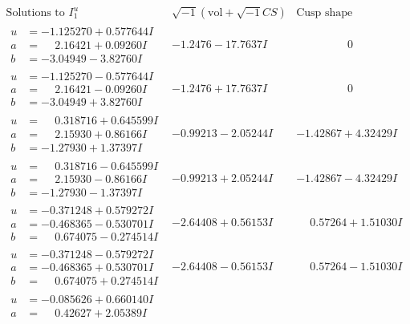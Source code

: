 \documentclass[1p]{elsarticle_modified}
\theoremstyle{definition}
\newcommand{\I}{\sqrt{-1}}
\begin{document}
$$\begin{array}{c|c|c}
\text{Solutions to }I^u_{1}& \I (\text{vol} + \sqrt{-1}CS) & \text{Cusp shape}\\
 \hline 
\begin{aligned}
u &= -1.125270 + 0.577644 I \\
a &= \phantom{-}2.16421 + 0.09260 I \\
b &= -3.04949 - 3.82760 I\end{aligned}
 & -1.2476 - 17.7637 I & \phantom{-0.000000 } 0 \\ \hline\begin{aligned}
u &= -1.125270 - 0.577644 I \\
a &= \phantom{-}2.16421 - 0.09260 I \\
b &= -3.04949 + 3.82760 I\end{aligned}
 & -1.2476 + 17.7637 I & \phantom{-0.000000 } 0 \\ \hline\begin{aligned}
u &= \phantom{-}0.318716 + 0.645599 I \\
a &= \phantom{-}2.15930 + 0.86166 I \\
b &= -1.27930 + 1.37397 I\end{aligned}
 & -0.99213 - 2.05244 I & -1.42867 + 4.32429 I \\ \hline\begin{aligned}
u &= \phantom{-}0.318716 - 0.645599 I \\
a &= \phantom{-}2.15930 - 0.86166 I \\
b &= -1.27930 - 1.37397 I\end{aligned}
 & -0.99213 + 2.05244 I & -1.42867 - 4.32429 I \\ \hline\begin{aligned}
u &= -0.371248 + 0.579272 I \\
a &= -0.468365 - 0.530701 I \\
b &= \phantom{-}0.674075 - 0.274514 I\end{aligned}
 & -2.64408 + 0.56153 I & \phantom{-}0.57264 + 1.51030 I \\ \hline\begin{aligned}
u &= -0.371248 - 0.579272 I \\
a &= -0.468365 + 0.530701 I \\
b &= \phantom{-}0.674075 + 0.274514 I\end{aligned}
 & -2.64408 - 0.56153 I & \phantom{-}0.57264 - 1.51030 I \\ \hline\begin{aligned}
u &= -0.085626 + 0.660140 I \\
a &= \phantom{-}0.42627 + 2.05389 I \\

\end{aligned}
\end{array}$$
\end{document}

